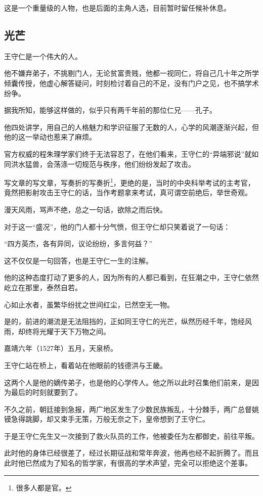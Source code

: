 \begin{multicols}{\theparacolNo}
这是一个重量级的人物，也是后面的主角人选，目前暂时留任候补休息。

\subsection{光芒}
王守仁是一个伟大的人。

他不嫌弃弟子，不挑剔门人，无论贫富贵贱，他都一视同仁，将自己几十年之所学倾囊传授，他虚心解答疑问，时刻检讨着自己的不足，没有门户之见，也不搞学术纷争。

据我所知，能够这样做的，似乎只有两千年前的那位仁兄——孔子。

他四处讲学，用自己的人格魅力和学识征服了无数的人，心学的风潮逐渐兴起，但他的这一举动也惹来了麻烦。

官方权威的程朱理学家们终于无法容忍了，在他们看来，王守仁的“异端邪说”就如同洪水猛兽，会荡涤一切规范与秩序，他们纷纷发起了攻击。

写文章的写文章，写奏折的写奏折\footnote{很多人都是官。}，更绝的是，当时的中央科举考试的主考官，竟然把影射攻击王守仁的话，当作考题拿来考试，真可谓空前绝后，举世奇观。

漫天风雨，骂声不绝，总之一句话，欲除之而后快。

对于这一“盛况”，他的门人都十分气愤，但王守仁却只笑着说了一句话：

“四方英杰，各有异同，议论纷纷，多言何益？”

这不仅仅是一句回答，也是王守仁一生的注解。

他的这种态度打动了更多的人，因为所有的人都已看到，在狂潮之中，王守仁依然屹立在那里，泰然自若。

心如止水者，虽繁华纷扰之世间红尘，已然空无一物。

是的，前进的潮流是无法阻挡的，正如同王守仁的光芒，纵然历经千年，饱经风雨，却终将光耀于天下万物之间。

嘉靖六年（1527年）五月，天泉桥。

王守仁站在桥上，看着站在他眼前的钱德洪与王畿。

这两个人是他的嫡传弟子，也是他的心学传人。他之所以此时召集他们前来，是因为最后的时刻就要到了。

不久之前，朝廷接到急报，两广地区发生了少数民族叛乱，十分棘手，两广总督姚镆急得跳脚，却又束手无策，万般无奈之下，皇帝想到了王守仁。

于是王守仁先生又一次接到了救火队员的工作，他被委任为左都御史，前往平叛。

此时他的身体已经很差了，经过长期征战和常年奔波，他再也经不起折腾了。而且此时他已然成为了知名的哲学家，有很高的学术声望，完全可以拒绝这个差事。


\end{multicols}
